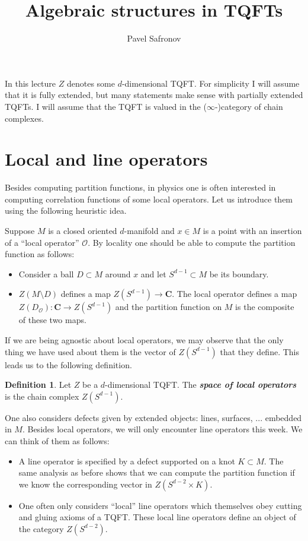 \documentclass[10pt]{amsart}
\newcommand{\C}{\mathbf{C}}
\newcommand{\cO}{\mathcal{O}}
\newcommand{\defterm}[1]{\textbf{\emph{#1}}}
\theoremstyle{definition}
\theoremstyle{definition}
\newtheorem{defn}[thm]{Definition}
\begin{document}
\title{Algebraic structures in TQFTs}
\author{Pavel Safronov}
\maketitle

In this lecture $Z$ denotes some $d$-dimensional TQFT. For simplicity I will assume that it is fully extended, but many statements make sense with partially extended TQFTs. I will assume that the TQFT is valued in the ($\infty$-)category of chain complexes.

\section{Local and line operators}

Besides computing partition functions, in physics one is often interested in computing correlation functions of some local operators. Let us introduce them using the following heuristic idea.

Suppose $M$ is a closed oriented $d$-manifold and $x\in M$ is a point with an insertion of a ``local operator'' $\cO$. By locality one should be able to compute the partition function as follows:
\begin{itemize}
\item Consider a ball $D\subset M$ around $x$ and let $S^{d-1}\subset M$ be its boundary.
\item $Z(M\setminus D)$ defines a map $Z(S^{d-1})\rightarrow \C$. The local operator defines a map $Z(D_{\cO})\colon \C\rightarrow Z(S^{d-1})$ and the partition function on $M$ is the composite of these two maps.
\end{itemize}

If we are being agnostic about local operators, we may observe that the only thing we have used about them is the vector of $Z(S^{d-1})$ that they define. This leads us to the following definition.

\begin{defn}
Let $Z$ be a $d$-dimensional TQFT. The \defterm{space of local operators} is the chain complex $Z(S^{d-1})$.
\end{defn}

One also considers defects given by extended objects: lines, surfaces, ... embedded in $M$. Besides local operators, we will only encounter line operators this week. We can think of them as follows:
\begin{itemize}
\item A line operator is specified by a defect supported on a knot $K\subset M$. The same analysis as before shows that we can compute the partition function if we know the corresponding vector in $Z(S^{d-2}\times K)$.

\item One often only considers ``local'' line operators which themselves obey cutting and gluing axioms of a TQFT. These local line operators define an object of the category $Z(S^{d-2})$.
\end{itemize}
\end{document}
